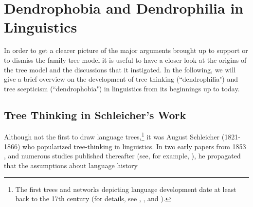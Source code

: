 \documentclass[svgnames,12pt]{scrartcl}
\begin{document}
\section{Dendrophobia and Dendrophilia in Linguistics}
In order to get a clearer picture of the major arguments brought up to support or to dismiss the
family tree model it is useful to have a closer look at the origins of the tree model and the
discussions that it instigated. In the following, we will give a brief overview on the development
of tree thinking (``dendrophilia") and tree scepticism (``dendrophobia") in linguistics from its
beginnings up to today.
 
\subsection{Tree Thinking in Schleicher's Work}
Although not the first to draw language trees,\footnote{The first trees and networks depicting
language development date at least back to the 17th century (for details, see \citealt{List2016h},
\citealt{Morrison2016}, and \citealt{Sutrop2012}).} it was August Schleicher (1821-1866) who
popularized tree-thinking in linguistics. In two early papers from 1853
\citep{Schleicher1853,Schleicher1853a}, and numerous studies published thereafter (see, for example,
\citealt{Schleicher1861,Schleicher1863}), he propagated that the assumptions about language history
\end{document}
